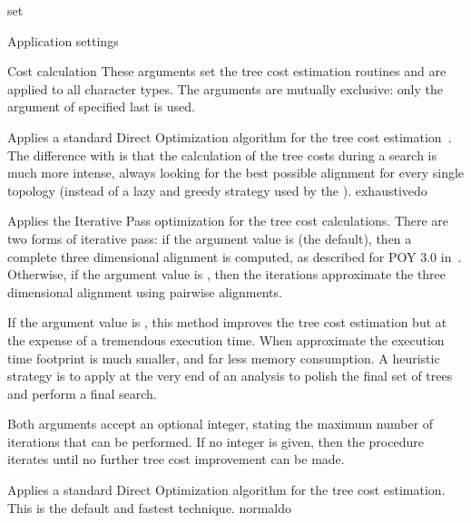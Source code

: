 \begin{command}{set}{}
\begin{arguments}
\begin{argumentgroup}{Application settings}
        \end{argumentgroup}

         \begin{argumentgroup}{Cost calculation}
            {These arguments set the tree cost estimation routines and
             are applied to all character types. The arguments
            are mutually exclusive: only the argument of 
             specified last is used.}

                {Applies a standard Direct Optimization algorithm for the tree
                cost estimation~\cite{wheeler1996,wheeler2002a}. The difference 
                with  is
                that the calculation of the tree costs during a search is much
                more intense, always looking for the best possible alignment 
                for every single topology (instead of a lazy and greedy strategy
                used by the ).}
                {exhaustivedo}

                {Applies the Iterative Pass optimization for the tree cost
                calculations. There are two forms of iterative pass: if the
                argument value is  (the default), then a complete three
                dimensional alignment is computed, as described for POY 3.0 in~\cite{wheeler2003a}. 
                Otherwise, if the argument value is , then the iterations
                approximate the three dimensional alignment using pairwise
                alignments. 
                 
                    If the argument value is , this method improves the tree
                cost estimation but at the expense of a tremendous execution
                time. When approximate the execution time footprint is much
                smaller, and far less memory consumption.
                A heuristic strategy is to apply   at the 
                very end of an analysis to polish the final set of trees and perform a final search. 
                
                Both arguments accept an optional integer, stating the maximum
                number of iterations that can be performed. If no integer is
                given, then the procedure iterates until no further tree cost
                improvement can be made.}
                {}
                {Applies a standard Direct Optimization algorithm for the tree
                cost estimation. This is the default and fastest technique.}
                {normaldo}


\end{argumentgroup}
\end{arguments}
\end{command}
